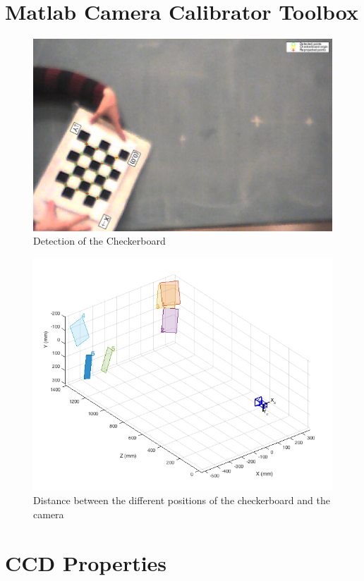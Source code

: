 \documentclass[12pt,a4paper,fleqn, onesside]{report}
\begin{document}
\section{Matlab Camera Calibrator Toolbox}
\label{Toolbox}
\begin{figure}[H]
  \centering
  \centerline{\includegraphics[scale=0.25]{fig/Checkboard.png}}
  \caption{Detection of the Checkerboard}
  \label{fig:checkerboard}
\end{figure}
\begin{figure}[H]
  \centering
  \centerline{\includegraphics[scale=0.45]{fig/Extrinsics.png}}
  \caption{Distance between the different positions of the checkerboard and the camera}
  \label{fig:extrinsics}
\end{figure}

\newpage
\section{CCD Properties}
\label{CCDdatasheet}






\end{document}
